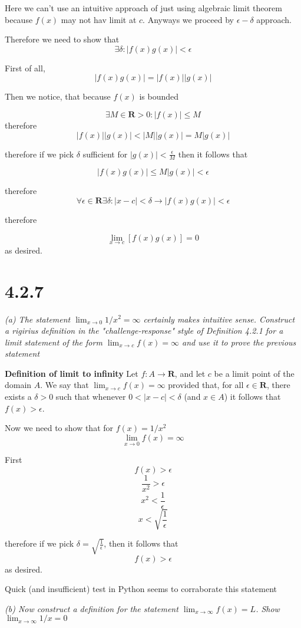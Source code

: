 \documentclass[11pt,oneside,titlepage]{book}
\begin{document}
Here we can't use an intuitive approach of just using algebraic limit theorem because $f(x)$ may
not hav limit at $c$.
Anyways we proceed by $\epsilon-\delta$ approach.

Therefore we need to show that
$$\exists \delta: |f(x)g(x)| < \epsilon$$

First of all,
$$ |f(x)g(x)| = |f(x)||g(x)|$$

Then we notice, that because $f(x)$ is bounded

$$\exists M \in \textbf{R} > 0: |f(x)| \leq M$$
therefore
$$|f(x)||g(x)| < |M||g(x)| = M|g(x)|$$

therefore if we pick $\delta$ sufficient for $|g(x)| < \frac{\epsilon}{M}$ then it follows that

$$|f(x)g(x)| \leq M|g(x)| < \epsilon$$

therefore
$$\forall \epsilon \in \textbf{R} \exists \delta : |x - c| < \delta \to |f(x)g(x)| < \epsilon$$

therefore

$$\lim_{x \to c}[f(x)g(x)] = 0$$
as desired.

\section*{4.2.7}
\textit{(a) The statement $\lim_{x \to 0}1/x^2 = \infty$ certainly makes intuitive sense. Construct a rigirius definition in the "challenge-response" style of Definition 4.2.1 for a limit statement of the form $\lim_{x \to c}f(x) = \infty$ and use it to prove the previous statement }

\textbf{Definition of limit to infinity}
Let $f : A \to \textbf{R}$, and let $c$ be a limit point of the domain $A$. We say that
$\lim_{x\to c} f(x) = \infty$ provided that, for all $\epsilon \in \textbf{R}$, there exists
a $\delta > 0$ such that whenever $0 < |x - c| < \delta$ (and $x \in A$) it follows
that $f(x) > \epsilon$.

Now we need to show that for  $f(x) = 1/x^2$
$$\lim_{x \to 0}f(x) = \infty$$

First
$$ f(x) > \epsilon$$
$$ \frac{1}{x^2} > \epsilon$$
$$ x^2 < \frac{1}{\epsilon}$$
$$ x < \sqrt{\frac{1}{\epsilon}}$$

therefore if we pick $\delta = \sqrt{\frac{1}{\epsilon}}$, then it follows that
$$ f(x) > \epsilon$$
as desired.

Quick (and insufficient) test in Python seems to corraborate  this statement

\textit{(b) Now construct a definition for the statement $\lim_{x \to \infty} f(x) = L$. Show
$\lim_{x \to \infty} 1/x = 0$}
\end{document}
